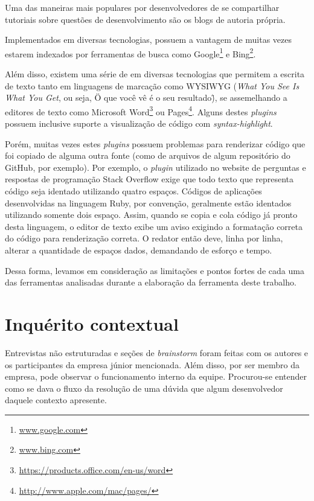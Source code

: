 Uma das maneiras mais populares por desenvolvedores de se compartilhar tutoriais sobre questões de desenvolvimento são os blogs de autoria própria.

Implementados em diversas tecnologias, possuem a vantagem de muitas vezes estarem indexados por ferramentas de busca como Google\footnote{\url{www.google.com}} e Bing\footnote{\url{www.bing.com}}.

Além disso, existem uma série de  em diversas tecnologias que permitem a escrita de texto tanto em linguagens de marcação como WYSIWYG (\textit{What You See Is What You Get}, ou seja, \"O que você vê é o seu resultado\"), se assemelhando a editores de texto como Microsoft Word\footnote{\url{https://products.office.com/en-us/word}} ou Pages\footnote{\url{http://www.apple.com/mac/pages/}}. Alguns destes \textit{plugins} possuem inclusive suporte a visualização de código com \textit{syntax-highlight}.

Porém, muitas vezes estes \textit{plugins} possuem problemas para renderizar código que foi copiado de alguma outra fonte (como de arquivos de algum repositório do GitHub, por exemplo). Por exemplo, o \textit{plugin} utilizado no website de perguntas e respostas de programação Stack Overflow exige que todo texto que representa código seja identado utilizando quatro espaços. Códigos de aplicações desenvolvidas na linguagem Ruby, por convenção, geralmente estão identados utilizando somente dois espaço. Assim, quando se copia e cola código já pronto desta linguagem, o editor de texto exibe um aviso exigindo a formatação correta do código para renderização correta. O redator então deve, linha por linha, alterar a quantidade de espaços dados, demandando de esforço e tempo.


Dessa forma, levamos em consideração as limitações e pontos fortes de cada uma das ferramentas analisadas durante a elaboração da ferramenta deste trabalho.

\section{Inquérito contextual}

Entrevistas não estruturadas e seções de \textit{brainstorm} foram feitas com os autores e os participantes da empresa júnior mencionada. Além disso, por ser membro da empresa, pode observar o funcionamento interno da equipe. Procurou-se entender como se dava o fluxo da resolução de uma dúvida que algum desenvolvedor daquele contexto apresente.

